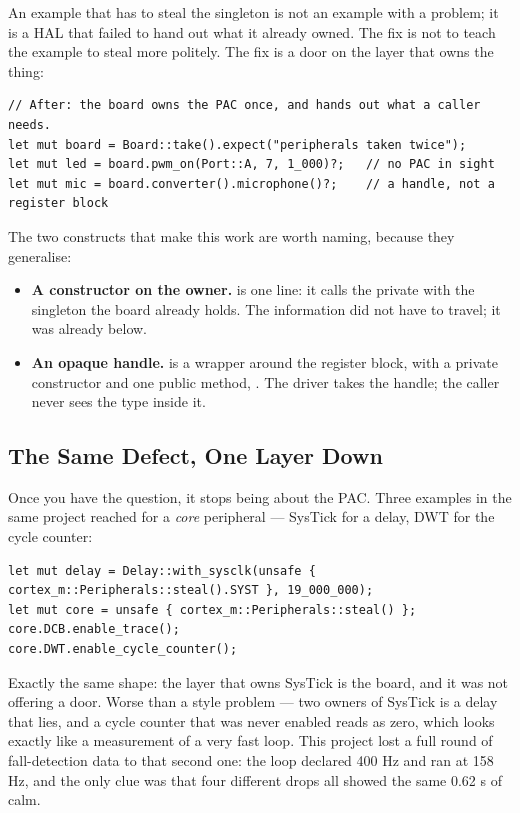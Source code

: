 An example that has to steal the singleton is not an example with a problem; it is a HAL that
failed to hand out what it already owned. The fix is not to teach the example to steal more
politely. The fix is a door on the layer that owns the thing:

\begin{verbatim}
// After: the board owns the PAC once, and hands out what a caller needs.
let mut board = Board::take().expect("peripherals taken twice");
let mut led = board.pwm_on(Port::A, 7, 1_000)?;   // no PAC in sight
let mut mic = board.converter().microphone()?;    // a handle, not a register block
\end{verbatim}

The two constructs that make this work are worth naming, because they generalise:

\begin{itemize}
    \item \textbf{A constructor on the owner.}  is one line: it calls the
          private  with the singleton the board already holds. The
          information did not have to travel; it was already below.
    \item \textbf{An opaque handle.}  is a 
          wrapper around the register block, with a private constructor and one public method,
          . The driver takes the handle; the caller never sees the type
          inside it.
\end{itemize}

\subsection{The Same Defect, One Layer Down}

Once you have the question, it stops being about the PAC. Three examples in the same project
reached for a \emph{core} peripheral — SysTick for a delay, DWT for the cycle counter:

\begin{verbatim}
let mut delay = Delay::with_sysclk(unsafe { cortex_m::Peripherals::steal().SYST }, 19_000_000);
let mut core = unsafe { cortex_m::Peripherals::steal() };
core.DCB.enable_trace();
core.DWT.enable_cycle_counter();
\end{verbatim}

Exactly the same shape: the layer that owns SysTick is the board, and it was not offering a door.
Worse than a style problem — two owners of SysTick is a delay that lies, and a cycle counter that
was never enabled reads as zero, which looks exactly like a measurement of a very fast loop. This
project lost a full round of fall-detection data to that second one: the loop declared 400 Hz and
ran at 158 Hz, and the only clue was that four different drops all showed the same 0.62 s of calm.

